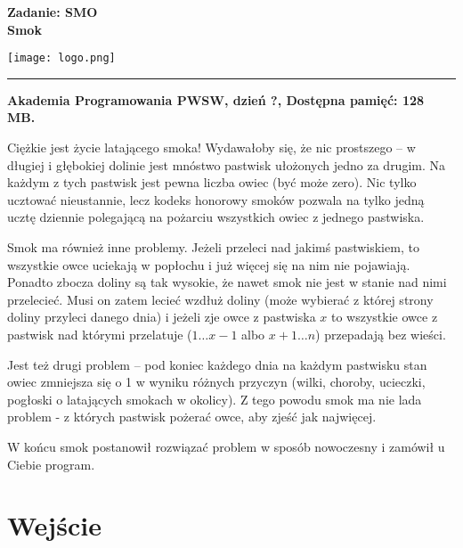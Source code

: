 \documentclass[10pt]{article}
\begin{document}
    

    \noindent
    \begin{minipage}{0.5\textwidth}
        \LARGE{\textsf{\textbf{Zadanie: SMO\\Smok}}}
    \end{minipage}
    \begin{minipage}{0.5\textwidth}
        \begin{flushright}
            \texttt{[image: logo.png]}
        \end{flushright}
    \end{minipage}
    
    \noindent\rule{\textwidth}{0.4pt}
    
    \noindent\textbf{Akademia Programowania PWSW, dzień ?, Dostępna pamięć: 128 MB.}
    \vspace{1em}
    
    
    \noindent
    Ciężkie jest życie latającego smoka! Wydawałoby się, że nic prostszego – w długiej i głębokiej dolinie jest mnóstwo pastwisk ułożonych jedno za drugim. Na każdym z tych pastwisk jest pewna liczba owiec (być może zero). Nic tylko ucztować nieustannie, lecz kodeks honorowy smoków pozwala na tylko jedną ucztę dziennie polegającą na pożarciu wszystkich owiec z jednego pastwiska.
    
    Smok ma również inne problemy. Jeżeli przeleci nad jakimś pastwiskiem, to wszystkie owce uciekają w popłochu i już więcej się na nim nie pojawiają. Ponadto zbocza doliny są tak wysokie, że nawet smok nie jest w stanie nad nimi przelecieć. Musi on zatem lecieć wzdłuż doliny (może wybierać z której strony doliny przyleci danego dnia) i jeżeli zje owce z pastwiska $x$ to wszystkie owce z pastwisk nad którymi przelatuje ($1\ldots x−1$ albo $x+1\ldots n$) przepadają bez wieści. 
    
    Jest też drugi problem – pod koniec każdego dnia na każdym pastwisku stan owiec zmniejsza się o 1 w wyniku różnych przyczyn (wilki, choroby, ucieczki, pogłoski o latających smokach w okolicy). Z tego powodu smok ma nie lada problem - z których pastwisk pożerać owce, aby zjeść jak najwięcej.
    
    W końcu smok postanowił rozwiązać problem w sposób nowoczesny i zamówił u Ciebie program.


    \section*{Wejście}
    
\end{document}
